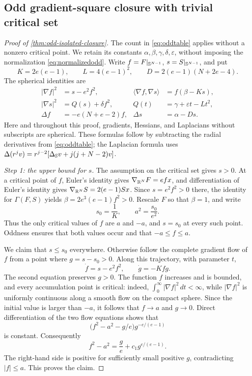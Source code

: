 \subsection{Odd gradient-square closure with trivial critical set}
\label{sec:odd-isolated-proof}

\begin{proof}[Proof of \cref{thm:odd-isolated-closure}]
The count in \eqref{eq:oddtable} applies without a nonzero critical
point. We retain its constants
\(\alpha,\beta,\gamma,\delta,\varepsilon\), without imposing the
normalization \eqref{eq:normalizedodd}. Write
\(f=F|_{\mathbb S^{N-1}}\), \(s=S|_{\mathbb S^{N-1}}\), and put
\[
 K=2e(e-1),\qquad L=4(e-1)^2,\qquad
 D=2(e-1)(N+2e-4).
\]
The spherical identities are
\begin{equation}\label{eq:odd-isolated-spherical}
\begin{aligned}
 |\nabla f|^2&=s-e^2f^2,&
 \langle\nabla f,\nabla s\rangle&=f(\beta-Ks),\\
 |\nabla s|^2&=Q(s)+\delta f^2,&
 Q(t)&=\gamma+\varepsilon t-Lt^2,\\
 \Delta f&=-e(N+e-2)f,&
 \Delta s&=\alpha-Ds.
\end{aligned}
\end{equation}
Here and throughout this proof, gradients, Hessians, and Laplacians
without subscripts are spherical. These formulas follow by subtracting
the radial derivatives from \eqref{eq:oddtable}; the Laplacian formula
uses \(\Delta(r^jv)=r^{j-2}[\Delta_{\mathbb S}v+j(j+N-2)v]\).

\emph{Step 1: the upper bound for \(s\).}
The assumption on the critical set gives \(s>0\). At a critical
point of \(f\), Euler's identity gives
\(\nabla_{\mathbb R^N}F=efx\), and differentiation of Euler's identity
gives \(\nabla_{\mathbb R^N}S=2(e-1)Sx\). Since \(s=e^2f^2>0\)
there, the identity for \(\Gamma(F,S)\) yields \(\beta=2e^3(e-1)f^2>0\).
Rescale \(F\) so that \(\beta=1\), and write
\[
 s_0=\frac1K,\qquad a^2=\frac{s_0}{e^2}.
\]
Thus the only critical values of \(f\) are \(a\) and \(-a\),
and \(s=s_0\) at every such point. Oddness ensures that both values
occur and that \(-a\leq f\leq a\).

We claim that \(s\leq s_0\) everywhere. Otherwise follow the complete
gradient flow of \(f\) from a point where \(g=s-s_0>0\). Along
this trajectory, with parameter \(t\),
\[
 \dot f=s-e^2f^2,\qquad \dot g=-Kfg.
\]
The second equation preserves \(g>0\). The function \(f\) increases
and is bounded, and every accumulation point is critical: indeed,
\(\int_0^\infty|\nabla f|^2\,dt<\infty\), while
\(|\nabla f|^2\) is uniformly continuous along a smooth flow on the
compact sphere. Since the initial value is larger than \(-a\), it
follows that \(f\to a\) and \(g\to0\). Direct differentiation
of the two flow equations shows that
\[
 \bigl(f^2-a^2-g/e\bigr)g^{-e/(e-1)}
\]
is constant. Consequently
\[
 f^2-a^2=\frac ge+c_1g^{e/(e-1)}.
\]
The right-hand side is positive for sufficiently small positive \(g\),
contradicting \(|f|\leq a\). This proves the claim.


\end{proof}
